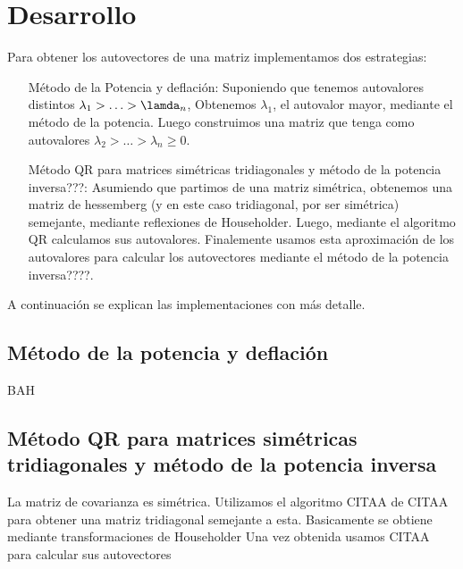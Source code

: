\section{Desarrollo}

\PARstart Para obtener los autovectores de una matriz implementamos
dos estrategias:
\begin{itemize}
	\item[M\'etodo de la Potencia y deflaci\'on:] Suponiendo que
	tenemos autovalores distintos $\lambda_1 > \ldots > \lamda_n$,
	Obtenemos $\lambda_1$, el autovalor mayor, mediante
	el m\'etodo de la potencia. Luego construimos una matriz que tenga
	como autovalores $\lambda_2 > \ldots > \lambda_n \geq 0$.

	\item[M\'etodo QR para matrices sim\'etricas tridiagonales y m\'etodo
	de la potencia inversa???:] Asumiendo que partimos de una matriz
	sim\'etrica, obtenemos una matriz de hessemberg (y en este caso
	tridiagonal, por ser sim\'etrica) semejante, mediante reflexiones de
	Householder. Luego, mediante el algoritmo QR calculamos sus
	autovalores. Finalemente usamos esta aproximaci\'on de
	los autovalores para calcular los autovectores mediante el m\'etodo
	de la potencia inversa????.
\end{itemize}

A continuaci\'on se explican las implementaciones con m\'as detalle.

\subsection{M\'etodo de la potencia y deflaci\'on}
BAH

\subsection{M\'etodo QR para matrices sim\'etricas tridiagonales y m\'etodo
de la potencia inversa}

La matriz de covarianza es sim\'etrica. Utilizamos el algoritmo CITAA de CITAA
para obtener una matriz tridiagonal semejante a esta. Basicamente se obtiene
mediante transformaciones de Householder
Una vez obtenida usamos CITAA para calcular sus autovectores
